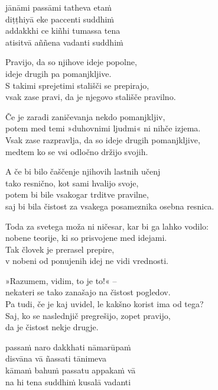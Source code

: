 jānāmi passāmi tatheva etaṁ\\
diṭṭhiyā eke paccenti suddhiṁ\\
addakkhi ce kiñhi tumassa tena\\
atisitvā aññena vadanti suddhiṁ


\clearpage

Pravijo, da so njihove ideje popolne,\\
ideje drugih pa pomanjkljive.\\
S takimi sprejetimi stališči se prepirajo,\\
vsak zase pravi, da je njegovo stališče pravilno.

Če je zaradi zaničevanja nekdo pomanjkljiv,\\
potem med temi »duhovnimi ljudmi« ni nihče izjema.\\
Vsak zase razpravlja, da so ideje drugih pomanjkljive,\\
medtem ko se vsi odločno držijo svojih.

A če bi bilo čaščenje njihovih lastnih učenj\\
tako resnično, kot sami hvalijo svoje,\\
potem bi bile vsakogar trditve pravilne,\\
saj bi bila čistost za vsakega posameznika osebna resnica.

Toda za svetega moža ni ničesar, kar bi ga lahko vodilo:\\
nobene teorije, ki so prisvojene med idejami.\\
Tak človek je prerasel prepire,\\
v nobeni od ponujenih idej ne vidi vrednosti.

»Razumem, vidim, to je to!« --\\
nekateri se tako zanašajo na čistost pogledov.\\
Pa tudi, če je kaj uvidel, le kakšno korist ima od tega?\\
Saj, ko se naslednjič pregrešijo, zopet pravijo,\\\vin da je čistost nekje drugje.


\clearpage

passaṁ naro dakkhati nāmarūpaṁ\\
disvāna vā ñassati tānimeva\\
kāmaṁ bahuṁ passatu appakaṁ vā\\
na hi tena suddhiṁ kusalā vadanti

